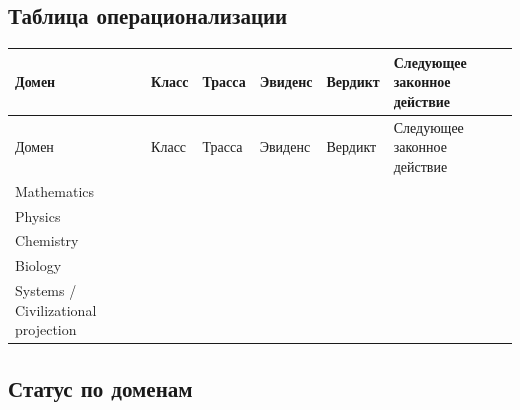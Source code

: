 \subsection{Таблица операционализации}
\begin{longtable}{@{}L{0.16\textwidth}L{0.11\textwidth}L{0.13\textwidth}L{0.13\textwidth}L{0.10\textwidth}L{0.17\textwidth}@{}}
\toprule
Домен & Класс & Трасса & Эвиденс & Вердикт & Следующее законное действие \\
\midrule
\endfirsthead
\toprule
Домен & Класс & Трасса & Эвиденс & Вердикт & Следующее законное действие \\
\midrule
\endhead
Mathematics &  &  &  &  &  \\
Physics &  &  &  &  &  \\
Chemistry &  &  &  &  &  \\
Biology &  &  &  &  &  \\
Systems / Civilizational projection &  &  &  &  &  \\
\bottomrule
\end{longtable}

\subsection{Статус по доменам}
